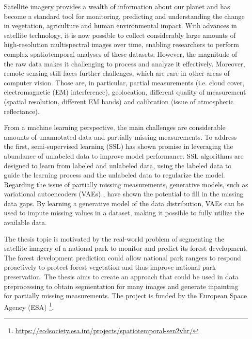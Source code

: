 

Satellite imagery provides a wealth of information about our planet and has become a standard tool for monitoring, predicting
and understanding the change in vegetation, agriculture and human environmental impact. With advances in satellite technology, it
is now possible to collect considerably large amounts of high-resolution multispectral images over time, enabling researchers to perform
complex spatiotemporal analyses of these datasets. However, the magnitude of the raw data makes it challenging to process and analyze it effectively. 
Moreover, remote sensing still faces further challenges, which are rare in other areas of computer vision. Those are, in particular, partial
measurements (i.e. cloud cover, electromagnetic (EM) interference), geolocation, different quality of measurement (spatial resolution, different
EM bands) and calibration (issue of atmospheric reflectance).

From a machine learning perspective, the main challenges are considerable amounts of unannotated data and partially missing measurements.
To address the first, semi-supervised learning (SSL) \cite{ssl-book-2006}  has shown promise in leveraging the abundance of unlabeled
data to improve model performance. SSL algorithms are designed to learn from labeled and unlabeled data, using the labeled data to guide the 
learning process and the unlabeled data to regularize the model. Regarding the issue of partially missing measurements, generative
models, such as variational autoencoders (VAEs) \cite{intro-vae-2019}, have shown the potential to fill in the missing data gaps. 
By learning a generative model of the data distribution, VAEs can be used to impute missing values in a dataset, making it possible to 
fully utilize the available data.

The thesis topic is motivated by the real-world problem of segmenting the satellite imagery of a national park to monitor and predict 
its forest development. The forest development prediction could allow national park rangers to respond proactively to protect forest 
vegetation and thus improve national park preservation. The thesis aims to create an approach that could be used in data preprocessing 
to obtain segmentation for many images and generate inpainting for partially missing measurements. The project is funded by the European
Space Agency (ESA) \footnote[1]{\url{https://eo4society.esa.int/projects/spatiotemporal-sen2vhr/}}.

